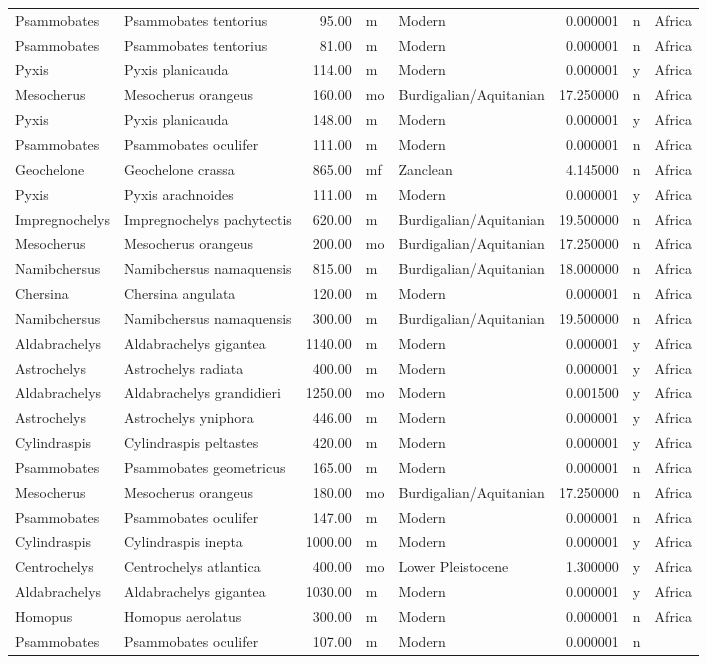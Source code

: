 \begin{landscape}
\begin{longtable}[]{@{}llrllrll@{}}
	Psammobates & Psammobates tentorius & 95.00 & m & Modern & 0.000001 & n
	& Africa\tabularnewline
	Psammobates & Psammobates tentorius & 81.00 & m & Modern & 0.000001 & n
	& Africa\tabularnewline
	Pyxis & Pyxis planicauda & 114.00 & m & Modern & 0.000001 & y &
	Africa\tabularnewline
	Mesocherus & Mesocherus orangeus & 160.00 & mo & Burdigalian/Aquitanian
	& 17.250000 & n & Africa\tabularnewline
	Pyxis & Pyxis planicauda & 148.00 & m & Modern & 0.000001 & y &
	Africa\tabularnewline
	Psammobates & Psammobates oculifer & 111.00 & m & Modern & 0.000001 & n
	& Africa\tabularnewline
	Geochelone & Geochelone crassa & 865.00 & mf & Zanclean & 4.145000 & n &
	Africa\tabularnewline
	Pyxis & Pyxis arachnoides & 111.00 & m & Modern & 0.000001 & y &
	Africa\tabularnewline
	Impregnochelys & Impregnochelys pachytectis & 620.00 & m &
	Burdigalian/Aquitanian & 19.500000 & n & Africa\tabularnewline
	Mesocherus & Mesocherus orangeus & 200.00 & mo & Burdigalian/Aquitanian
	& 17.250000 & n & Africa\tabularnewline
	Namibchersus & Namibchersus namaquensis & 815.00 & m &
	Burdigalian/Aquitanian & 18.000000 & n & Africa\tabularnewline
	Chersina & Chersina angulata & 120.00 & m & Modern & 0.000001 & n &
	Africa\tabularnewline
	Namibchersus & Namibchersus namaquensis & 300.00 & m &
	Burdigalian/Aquitanian & 19.500000 & n & Africa\tabularnewline
	Aldabrachelys & Aldabrachelys gigantea & 1140.00 & m & Modern & 0.000001
	& y & Africa\tabularnewline
	Astrochelys & Astrochelys radiata & 400.00 & m & Modern & 0.000001 & y &
	Africa\tabularnewline
	Aldabrachelys & Aldabrachelys grandidieri & 1250.00 & mo & Modern &
	0.001500 & y & Africa\tabularnewline
	Astrochelys & Astrochelys yniphora & 446.00 & m & Modern & 0.000001 & y
	& Africa\tabularnewline
	Cylindraspis & Cylindraspis peltastes & 420.00 & m & Modern & 0.000001 &
	y & Africa\tabularnewline
	Psammobates & Psammobates geometricus & 165.00 & m & Modern & 0.000001 &
	n & Africa\tabularnewline
	Mesocherus & Mesocherus orangeus & 180.00 & mo & Burdigalian/Aquitanian
	& 17.250000 & n & Africa\tabularnewline
	Psammobates & Psammobates oculifer & 147.00 & m & Modern & 0.000001 & n
	& Africa\tabularnewline
	Cylindraspis & Cylindraspis inepta & 1000.00 & m & Modern & 0.000001 & y
	& Africa\tabularnewline
	Centrochelys & Centrochelys atlantica & 400.00 & mo & Lower Pleistocene
	& 1.300000 & y & Africa\tabularnewline
	Aldabrachelys & Aldabrachelys gigantea & 1030.00 & m & Modern & 0.000001
	& y & Africa\tabularnewline
	Homopus & Homopus aerolatus & 300.00 & m & Modern & 0.000001 & n &
	Africa\tabularnewline
	Psammobates & Psammobates oculifer & 107.00 & m & Modern & 0.000001 & n

\end{longtable}
\end{landscape}
